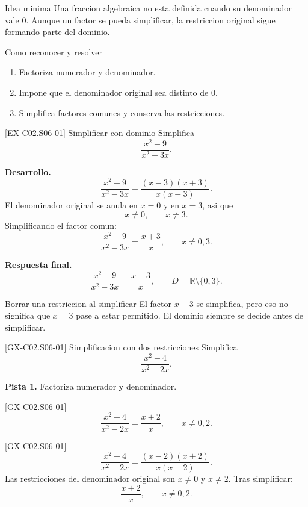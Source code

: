 \begin{theorybox}{Idea minima}
Una fraccion algebraica no esta definida cuando su denominador vale \(0\). Aunque un factor se
pueda simplificar, la restriccion original sigue formando parte del dominio.
\end{theorybox}

\begin{methodbox}{Como reconocer y resolver}
\begin{enumerate}
  \item Factoriza numerador y denominador.
  \item Impone que el denominador original sea distinto de \(0\).
  \item Simplifica factores comunes y conserva las restricciones.
\end{enumerate}
\end{methodbox}

\begin{solvedexample}{[EX-C02.S06-01] Simplificar con dominio}
Simplifica
\[
\frac{x^2-9}{x^2-3x}.
\]

\textbf{Desarrollo.}
\[
\frac{x^2-9}{x^2-3x}=\frac{(x-3)(x+3)}{x(x-3)}.
\]
El denominador original se anula en \(x=0\) y en \(x=3\), asi que
\[
x\neq 0,\qquad x\neq 3.
\]
Simplificando el factor comun:
\[
\frac{x^2-9}{x^2-3x}=\frac{x+3}{x},\qquad x\neq 0,3.
\]

\textbf{Respuesta final.}
\[
\frac{x^2-9}{x^2-3x}=\frac{x+3}{x},\qquad D=\mathbb{R}\setminus\{0,3\}.
\]
\end{solvedexample}

\begin{commonerror}{Borrar una restriccion al simplificar}
El factor \(x-3\) se simplifica, pero eso no significa que \(x=3\) pase a estar permitido.
El dominio siempre se decide antes de simplificar.
\end{commonerror}

\begin{guidedexercise}{[GX-C02.S06-01] Simplificacion con dos restricciones}
Simplifica
\[
\frac{x^2-4}{x^2-2x}.
\]

\textbf{Pista 1.} Factoriza numerador y denominador.
\end{guidedexercise}

\begin{shortanswer}{[GX-C02.S06-01]}
\[
\frac{x^2-4}{x^2-2x}=\frac{x+2}{x},\qquad x\neq 0,2.
\]
\end{shortanswer}

\begin{fullsolution}{[GX-C02.S06-01]}
\[
\frac{x^2-4}{x^2-2x}=\frac{(x-2)(x+2)}{x(x-2)}.
\]
Las restricciones del denominador original son \(x\neq 0\) y \(x\neq 2\). Tras simplificar:
\[
\frac{x+2}{x},\qquad x\neq 0,2.
\]
\end{fullsolution}


